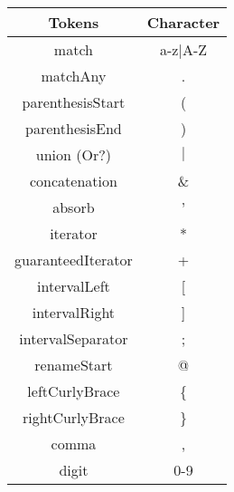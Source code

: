 \begin{tabular}{|c|c|}
    \hline
    \textbf{Tokens} & \textbf{Character}\\
    \hline
    match & a-z$\mid$A-Z\\
    \hline
    matchAny & .\\
    \hline
    parenthesisStart & (\\
    \hline
    parenthesisEnd & )\\
    \hline
    union (Or?) & $\mid$\\
    \hline
    concatenation & \&\\
    \hline
    absorb & '\\
    \hline
    iterator & *\\
    \hline
    guaranteedIterator & +\\
    \hline
    intervalLeft & [\\
    \hline
    intervalRight & ]\\
    \hline
    intervalSeparator & ;\\
    \hline
    renameStart & @\\
    \hline
    leftCurlyBrace & \{\\
    \hline
    rightCurlyBrace & \}\\
    \hline
    comma & ,\\
    \hline
    digit & 0-9\\
    \hline
\end{tabular}